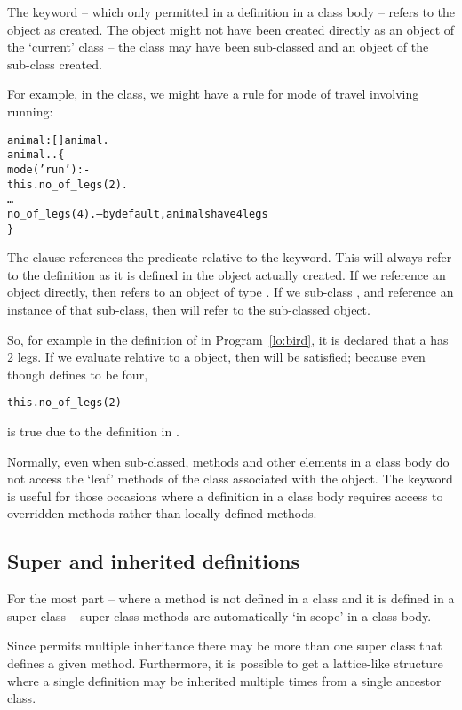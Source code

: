 The  keyword -- which only permitted in a definition in a class body -- refers to the object as created. The object might not have been created directly as an object of the `current' class -- the class may have been sub-classed and an object of the sub-class created.

For example, in the  class, we might have a rule for mode of travel involving running:
\begin{alltt}
animal:[]\conarrow{}animal.
animal..\{
  mode('run') :-
    this.no\_of\_legs(2).
  \ldots
  no\_of\_legs(4).       -- by default, animals have 4 legs
\}
\end{alltt}
The  clause references the  predicate relative to the  keyword. This will always refer to the  definition as it is defined in the object actually created. If we reference an  object directly, then  refers to an object of type . If we sub-class , and reference an instance of that sub-class, then  will refer to the sub-classed object.

So, for example in the definition of  in Program~\vref{lo:bird}, it is declared that a  has 2 legs. If we evaluate  relative to a  object, then  will be satisfied; because even though  defines  to be four,
\begin{alltt}
this.no\_of\_legs(2)
\end{alltt}
is true due to the definition in .

Normally, even when sub-classed, methods and other elements in a class body do not access the `leaf' methods of the class associated with the object. The  keyword is useful for those occasions where a definition in a class body requires access to overridden methods rather than locally defined methods.

\subsection{Super and inherited definitions}
\label{objects:super}
For the most part -- where a method is not defined in a class and it is defined in a super class -- super class methods are automatically `in scope' in a class body. 

Since \go permits multiple inheritance there may be more than one super class that defines a given method. Furthermore, it is possible to get a lattice-like structure where a single definition may be inherited multiple times from a single ancestor class.

